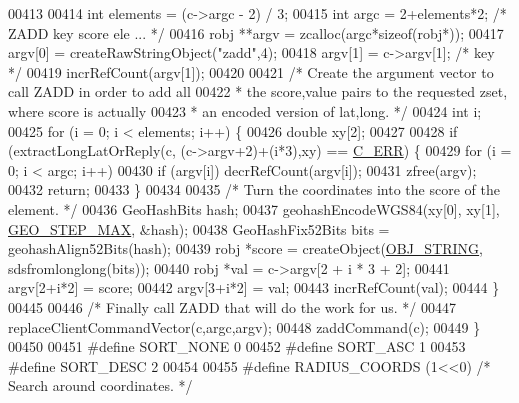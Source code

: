 \begin{DoxyCode}
{{{{{{{{{00413 
00414     \textcolor{keywordtype}{int} elements = (c->argc - 2) / 3;
00415     \textcolor{keywordtype}{int} argc = 2+elements*2; \textcolor{comment}{/* ZADD key score ele ... */}
00416     robj **argv = zcalloc(argc*\textcolor{keyword}{sizeof}(robj*));
00417     argv[0] = createRawStringObject(\textcolor{stringliteral}{"zadd"},4);
00418     argv[1] = c->argv[1]; \textcolor{comment}{/* key */}
00419     incrRefCount(argv[1]);
00420 
00421     \textcolor{comment}{/* Create the argument vector to call ZADD in order to add all}
00422 \textcolor{comment}{     * the score,value pairs to the requested zset, where score is actually}
00423 \textcolor{comment}{     * an encoded version of lat,long. */}
00424     \textcolor{keywordtype}{int} i;
00425     \textcolor{keywordflow}{for} (i = 0; i < elements; i++) \{
00426         \textcolor{keywordtype}{double} xy[2];
00427 
00428         \textcolor{keywordflow}{if} (extractLongLatOrReply(c, (c->argv+2)+(i*3),xy) == \hyperlink{server_8h_af98ac28d5f4d23d7ed5985188e6fb7d1}{C\_ERR}) \{
00429             \textcolor{keywordflow}{for} (i = 0; i < argc; i++)
00430                 \textcolor{keywordflow}{if} (argv[i]) decrRefCount(argv[i]);
00431             zfree(argv);
00432             \textcolor{keywordflow}{return};
00433         \}
00434 
00435         \textcolor{comment}{/* Turn the coordinates into the score of the element. */}
00436         GeoHashBits hash;
00437         geohashEncodeWGS84(xy[0], xy[1], \hyperlink{geohash_8h_a4c2e31e393c541a34939f7b4ae1d23d3}{GEO\_STEP\_MAX}, &hash);
00438         GeoHashFix52Bits bits = geohashAlign52Bits(hash);
00439         robj *score = createObject(\hyperlink{server_8h_a65236ea160f69cdef33ec942092af88f}{OBJ\_STRING}, sdsfromlonglong(bits));
00440         robj *val = c->argv[2 + i * 3 + 2];
00441         argv[2+i*2] = score;
00442         argv[3+i*2] = val;
00443         incrRefCount(val);
00444     \}
00445 
00446     \textcolor{comment}{/* Finally call ZADD that will do the work for us. */}
00447     replaceClientCommandVector(c,argc,argv);
00448     zaddCommand(c);
00449 \}
00450 
00451 \textcolor{preprocessor}{#}\textcolor{preprocessor}{define} \textcolor{preprocessor}{SORT\_NONE} 0
00452 \textcolor{preprocessor}{#}\textcolor{preprocessor}{define} \textcolor{preprocessor}{SORT\_ASC} 1
00453 \textcolor{preprocessor}{#}\textcolor{preprocessor}{define} \textcolor{preprocessor}{SORT\_DESC} 2
00454 
00455 \textcolor{preprocessor}{#}\textcolor{preprocessor}{define} \textcolor{preprocessor}{RADIUS\_COORDS} \textcolor{preprocessor}{(}1\textcolor{preprocessor}{<<}0\textcolor{preprocessor}{)}    \textcolor{comment}{/* Search around coordinates. */}
}}}}}}}}}
\end{DoxyCode}
